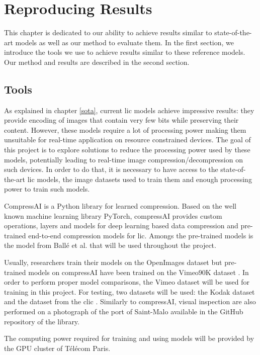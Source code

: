 \chapter{Reproducing Results}
\label{part_1}
This chapter is dedicated to our ability to achieve results similar to state-of-the-art models as well as our method to evaluate them. In the first section, we introduce the tools we use to achieve results similar to these reference models. Our method and results are described in the second section.

\section{Tools}
As explained in chapter \ref{sota}, current \acrshort{lic} models achieve impressive results: they provide encoding of images that contain very few bits while preserving their content. However, these models require a lot of processing power making them unsuitable for real-time application on resource constrained devices. The goal of this project is to explore solutions to reduce the processing power used by these models, potentially leading to real-time image compression/decompression on such devices. In order to do that, it is necessary to have access to the state-of-the-art \acrshort{lic} models, the image datasets used to train them and enough processing power to train such models.

CompressAI \cite{compressai} is a Python library for learned compression. Based on the well known machine learning library PyTorch, compressAI provides custom operations, layers and models for deep learning based data compression and pre-trained end-to-end compression models for \acrshort{lic}. Amongs the pre-trained models is the model from Ballé et al. \cite{ballé2018variationalimagecompressionscale} that will be used throughout the project.

Usually, researchers train their models on the OpenImages dataset \cite{openimages} but pre-trained models on compressAI have been trained on the Vimeo90K dataset \cite{xue2019video}. In order to perform proper model comparisons, the Vimeo dataset will be used for training in this project. For testing, two datasets will be used: the Kodak dataset \cite{kodak} and the dataset from the \acrfull{clic} \cite{clic}. Similarly to compressAI, visual inspection are also performed on a photograph of the port of Saint-Malo available in the GitHub repository of the library.

The computing power required for training and using models will be provided by the GPU cluster of Télécom Paris.

